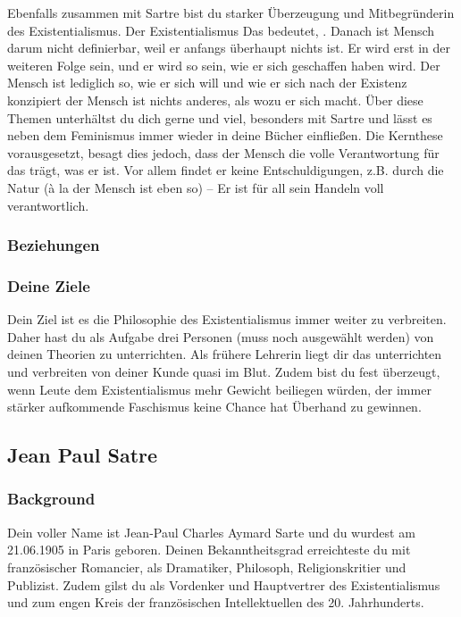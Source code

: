 \documentclass[12pt, a4paper, openany]{report}
\begin{document}
Ebenfalls zusammen mit Sartre bist du starker Überzeugung und Mitbegründerin des Existentialismus. Der Existentialismus  Das bedeutet, . Danach ist Mensch darum nicht definierbar, weil er anfangs überhaupt nichts ist. Er wird erst in der weiteren Folge sein, und er wird so sein, wie er sich geschaffen haben wird. Der Mensch ist lediglich so, wie er sich will und wie er sich nach der Existenz konzipiert der Mensch ist nichts anderes, als wozu er sich macht. Über diese Themen unterhältst du dich gerne und viel, besonders mit Sartre und lässt es neben dem Feminismus immer wieder in deine Bücher einfließen. Die Kernthese vorausgesetzt, besagt dies jedoch, dass der Mensch die volle Verantwortung für das trägt, was er ist. Vor allem findet er keine Entschuldigungen, z.B. durch die Natur (à la der Mensch ist eben so) – Er ist für all sein Handeln voll verantwortlich. 


\subsubsection{Beziehungen}

\subsubsection{Deine Ziele}

Dein Ziel ist es die Philosophie des Existentialismus immer weiter zu verbreiten. Daher hast du als Aufgabe drei Personen (muss noch ausgewählt werden) von deinen Theorien zu unterrichten. Als frühere Lehrerin liegt dir das unterrichten und verbreiten von deiner Kunde quasi im Blut. Zudem bist du fest überzeugt, wenn Leute dem Existentialismus mehr Gewicht beiliegen würden, der immer stärker aufkommende Faschismus keine Chance hat Überhand zu gewinnen.

\subsection{Jean Paul Satre}

\subsubsection{Background}
Dein voller Name ist Jean-Paul Charles Aymard Sarte und du wurdest am 21.06.1905 in Paris geboren. Deinen Bekanntheitsgrad erreichteste du mit französischer Romancier, als Dramatiker, Philosoph, Religionskritier und Publizist. Zudem gilst du als Vordenker und Hauptvertrer des Existentialismus und zum engen Kreis der französischen Intellektuellen des 20. Jahrhunderts. \\
\end{document}
